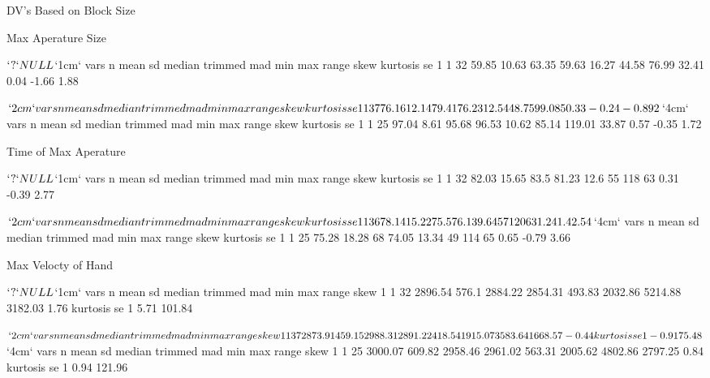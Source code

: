 \documentclass{article}
\begin{document}
\newpage

\normalsize
\bf
\centerline{DV's Based on Block Size}
\small
Max Aperature Size
\begin{Schunk}
\begin{Soutput}
$`?`
NULL

$`1cm`
  vars  n  mean    sd median trimmed   mad   min   max range skew kurtosis   se
1    1 32 59.85 10.63  63.35   59.63 16.27 44.58 76.99 32.41 0.04    -1.66 1.88

$`2cm`
  vars  n  mean    sd median trimmed   mad   min   max range  skew kurtosis se
1    1 37 76.16 12.14  79.41   76.23 12.54 48.75 99.08 50.33 -0.24    -0.89  2

$`4cm`
  vars  n  mean   sd median trimmed   mad   min    max range skew kurtosis   se
1    1 25 97.04 8.61  95.68   96.53 10.62 85.14 119.01 33.87 0.57    -0.35 1.72
\end{Soutput}
\end{Schunk}

Time of Max Aperature
\begin{Schunk}
\begin{Soutput}
$`?`
NULL

$`1cm`
  vars  n  mean    sd median trimmed  mad min max range skew kurtosis   se
1    1 32 82.03 15.65   83.5   81.23 12.6  55 118    63 0.31    -0.39 2.77

$`2cm`
  vars  n  mean    sd median trimmed  mad min max range skew kurtosis   se
1    1 36 78.14 15.22   75.5   76.13 9.64  57 120    63 1.24      1.4 2.54

$`4cm`
  vars  n  mean    sd median trimmed   mad min max range skew kurtosis   se
1    1 25 75.28 18.28     68   74.05 13.34  49 114    65 0.65    -0.79 3.66
\end{Soutput}
\end{Schunk}

Max Velocty of Hand
\begin{Schunk}
\begin{Soutput}
$`?`
NULL

$`1cm`
  vars  n    mean    sd  median trimmed    mad     min     max   range skew
1    1 32 2896.54 576.1 2884.22 2854.31 493.83 2032.86 5214.88 3182.03 1.76
  kurtosis     se
1     5.71 101.84

$`2cm`
  vars  n    mean     sd  median trimmed    mad     min     max   range  skew
1    1 37 2873.91 459.15 2988.31 2891.22 418.54 1915.07 3583.64 1668.57 -0.44
  kurtosis    se
1    -0.91 75.48

$`4cm`
  vars  n    mean     sd  median trimmed    mad     min     max   range skew
1    1 25 3000.07 609.82 2958.46 2961.02 563.31 2005.62 4802.86 2797.25 0.84
  kurtosis     se
1     0.94 121.96
\end{Soutput}
\end{Schunk}
\end{document}
